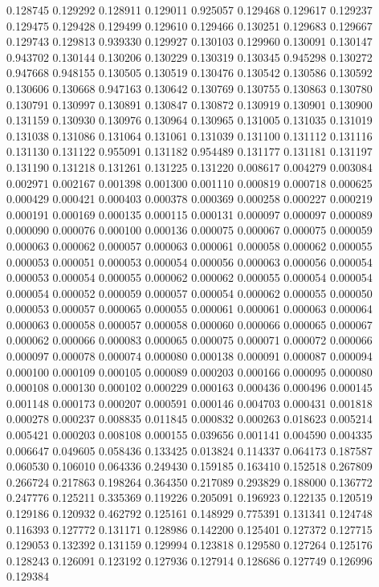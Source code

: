 0.128745
0.129292
0.128911
0.129011
0.925057
0.129468
0.129617
0.129237
0.129475
0.129428
0.129499
0.129610
0.129466
0.130251
0.129683
0.129667
0.129743
0.129813
0.939330
0.129927
0.130103
0.129960
0.130091
0.130147
0.943702
0.130144
0.130206
0.130229
0.130319
0.130345
0.945298
0.130272
0.947668
0.948155
0.130505
0.130519
0.130476
0.130542
0.130586
0.130592
0.130606
0.130668
0.947163
0.130642
0.130769
0.130755
0.130863
0.130780
0.130791
0.130997
0.130891
0.130847
0.130872
0.130919
0.130901
0.130900
0.131159
0.130930
0.130976
0.130964
0.130965
0.131005
0.131035
0.131019
0.131038
0.131086
0.131064
0.131061
0.131039
0.131100
0.131112
0.131116
0.131130
0.131122
0.955091
0.131182
0.954489
0.131177
0.131181
0.131197
0.131190
0.131218
0.131261
0.131225
0.131220
0.008617
0.004279
0.003084
0.002971
0.002167
0.001398
0.001300
0.001110
0.000819
0.000718
0.000625
0.000429
0.000421
0.000403
0.000378
0.000369
0.000258
0.000227
0.000219
0.000191
0.000169
0.000135
0.000115
0.000131
0.000097
0.000097
0.000089
0.000090
0.000076
0.000100
0.000136
0.000075
0.000067
0.000075
0.000059
0.000063
0.000062
0.000057
0.000063
0.000061
0.000058
0.000062
0.000055
0.000053
0.000051
0.000053
0.000054
0.000056
0.000063
0.000056
0.000054
0.000053
0.000054
0.000055
0.000062
0.000062
0.000055
0.000054
0.000054
0.000054
0.000052
0.000059
0.000057
0.000054
0.000062
0.000055
0.000050
0.000053
0.000057
0.000065
0.000055
0.000061
0.000061
0.000063
0.000064
0.000063
0.000058
0.000057
0.000058
0.000060
0.000066
0.000065
0.000067
0.000062
0.000066
0.000083
0.000065
0.000075
0.000071
0.000072
0.000066
0.000097
0.000078
0.000074
0.000080
0.000138
0.000091
0.000087
0.000094
0.000100
0.000109
0.000105
0.000089
0.000203
0.000166
0.000095
0.000080
0.000108
0.000130
0.000102
0.000229
0.000163
0.000436
0.000496
0.000145
0.001148
0.000173
0.000207
0.000591
0.000146
0.004703
0.000431
0.001818
0.000278
0.000237
0.008835
0.011845
0.000832
0.000263
0.018623
0.005214
0.005421
0.000203
0.008108
0.000155
0.039656
0.001141
0.004590
0.004335
0.006647
0.049605
0.058436
0.133425
0.013824
0.114337
0.064173
0.187587
0.060530
0.106010
0.064336
0.249430
0.159185
0.163410
0.152518
0.267809
0.266724
0.217863
0.198264
0.364350
0.217089
0.293829
0.188000
0.136772
0.247776
0.125211
0.335369
0.119226
0.205091
0.196923
0.122135
0.120519
0.129186
0.120932
0.462792
0.125161
0.148929
0.775391
0.131341
0.124748
0.116393
0.127772
0.131171
0.128986
0.142200
0.125401
0.127372
0.127715
0.129053
0.132392
0.131159
0.129994
0.123818
0.129580
0.127264
0.125176
0.128243
0.126091
0.123192
0.127936
0.127914
0.128686
0.127749
0.126996
0.129384
